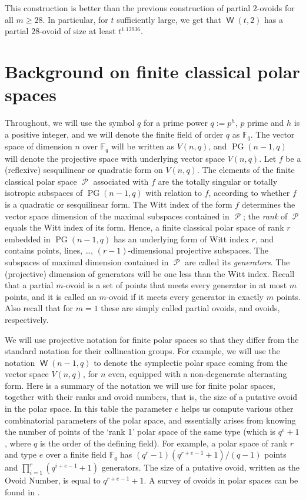 \documentclass[a4paper,11pt]{amsproc}
\theoremstyle{plain}
\theoremstyle{definition}
\newcommand{\F}{{\mathbb F}}
\newcommand{\<}{\langle}
\renewcommand{\>}{\rangle} %
\DeclareMathOperator\p{\mathcal{P}}
\DeclareMathOperator\pg{\mathrm{PG}}
\DeclareMathOperator\w{\mathsf{W}}
\begin{document}
This construction is better than the previous construction of partial $2$-ovoids for all $m \geq 28$.
In particular, for $t$ sufficiently large, we get that $\w(t,2)$ has a partial $28$-ovoid of size at least $t^{1.12936}$.

\section{Background on finite classical polar spaces}\label{background}

Throughout, we will use the symbol $q$ for a prime power $q:=p^h$, $p$ prime and $h$ is a positive integer, and we
will denote the finite field of order $q$ as $\F_q$. The vector space of dimension $n$ over
$\F_q$ will be written as $V(n,q)$, and $\pg(n-1,q)$ will denote the projective space with
underlying vector space $V(n,q)$. Let $f$ be a (reflexive) sesquilinear or quadratic form on
$V(n,q)$. The elements of the finite classical polar space $\p$ associated with $f$ are the
totally singular or totally isotropic subspaces of $\pg(n - 1,q)$ with relation to $f$, according to
whether $f$ is a quadratic or sesquilinear form. The Witt index of the form $f$ determines the vector space
dimension of the maximal subspaces contained in $\p$; the {\em rank} of $\p$ equals the
Witt index of its form. 
Hence, a finite classical polar space of rank $r$ embedded in $\pg(n - 1,q)$ has an underlying
form of Witt index $r$, and contains points, lines, \ldots, $(r-1)$-dimensional projective subspaces. The
subspaces of maximal dimension contained in $\p$ are called its \emph{generators}.
The (projective) dimension of generators will be one less than the Witt index.
Recall that a partial $m$-ovoid is a set of points that meets every generator in at most $m$ points, and it is called an $m$-ovoid if it meets every generator in exactly $m$ points. 
Also recall that for $m = 1$ these are simply called partial ovoids, and ovoids, respectively.

We will use projective notation for finite polar spaces so that they differ from the standard
notation for their collineation groups. For example, we will use the notation $\w(n-1,q)$ to denote
the symplectic polar space coming from the vector space $V(n,q)$, for $n$ even, equipped with a non-degenerate
alternating form. 
Here is a summary of the notation we will use for finite polar spaces, together
with their ranks and ovoid numbers, that is, the size of a putative ovoid in the polar space. 
In this table the parameter $e$ helps us compute various other combinatorial parameters of the polar space,
and essentially arises from knowing the number of points of the `rank 1' polar space of the same type
(which is $q^e+1$, where $q$ is the order of the defining field).
For example, a polar space of rank $r$ and type $e$ over a finite field $\mathbb{F}_q$ has $(q^r - 1)(q^{r + e - 1} + 1)/(q - 1)$ points and 
$\prod_{i = 1}^{r} (q^{i + e - 1} + 1)$ generators. The size of a putative ovoid, written as the Ovoid Number, is equal to $q^{r + e - 1} + 1$. 
A survey of ovoids in polar spaces can be found in \cite{DBKM}.
\end{document}

